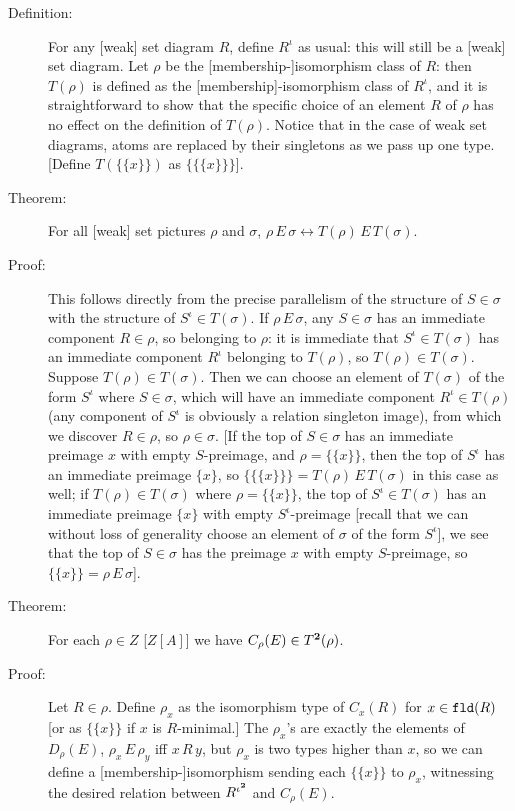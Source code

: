 \documentclass[12pt]{book}
\begin{document}
\begin{description}

\item[Definition:] For any [weak] set diagram $R$, define $R^{\iota}$
as usual: this will still be a [weak] set diagram.  Let $\rho$ be the
[membership-]isomorphism class of $R$: then $T(\rho)$ is defined as
the [membership]-isomorphism class of $R^{\iota}$, and it is
straightforward to show that the specific choice of an element $R$ of
$\rho$ has no effect on the definition of $T(\rho)$.  Notice that in
the case of weak set diagrams, atoms are replaced by their singletons
as we pass up one type.  [Define $T(\{\{x\}\})$ as $\{\{\{x\}\}\}$].

\newpage


\item[Theorem:] For all [weak] set pictures $\rho$ and $\sigma$, $\rho
\,E\, \sigma \leftrightarrow T(\rho) \,E\, T(\sigma)$.

\item[Proof:] This follows directly from the precise parallelism of
the structure of $S\in \sigma$ with the structure of $S^{\iota} \in
T(\sigma)$.  If $\rho \,E\, \sigma$, any $S\in \sigma$ has an
immediate component $R \in \rho$, so belonging to $\rho$: it is
immediate that $S^{\iota}\in T(\sigma)$ has an immediate component
$R^{\iota}$ belonging to $T(\rho)$, so $T(\rho) \in T(\sigma)$.
Suppose $T(\rho) \in T(\sigma)$.  Then we can choose an element of
$T(\sigma)$ of the form $S^{\iota}$ where $S \in \sigma$, which will
have an immediate component $R^{\iota} \in T(\rho)$ (any component of
$S^{\iota}$ is obviously a relation singleton image), from which we
discover $R \in \rho$, so $\rho \in \sigma$.  [If the top of $S \in
\sigma$ has an immediate preimage $x$ with empty $S$-preimage, and
$\rho = \{\{x\}\}$, then the top of $S^{\iota}$ has an immediate
preimage $\{x\}$, so $\{\{\{x\}\}\} = T(\rho) \,E\, T(\sigma)$ in this
case as well; if $T(\rho) \in T(\sigma)$ where $\rho=\{\{x\}\}$, the
top of $S^{\iota} \in T(\sigma)$ has an immediate preimage $\{x\}$
with empty $S^{\iota}$-preimage [recall that we can without loss of
generality choose an element of $\sigma$ of the form $S^{\iota}$], we
see that the top of $S \in \sigma$ has the preimage $x$ with empty
$S$-preimage, so $\{\{x\}\} = \rho \,E\,\sigma$].

\item[Theorem:] For each $\rho \in Z$ [$Z[A]$] we have $C_{\rho}(E)
\in T^{\bf 2}(\rho)$.

\item[Proof:] Let $R \in \rho$.  Define $\rho_x$ as the isomorphism
type of $C_x(R)$ for $x \in {\tt fld}(R)$ [or as $\{\{x\}\}$ if $x$ is
$R$-minimal.]  The $\rho_x$'s are exactly the elements of
$D_{\rho}(E)$, $\rho_x \,E\, \rho_y$ iff $x\,R\,y$, but $\rho_x$ is
two types higher than $x$, so we can define a [membership-]isomorphism
sending each $\{\{x\}\}$ to $\rho_x$, witnessing the desired relation between
$R^{\iota^{\bf 2}}$ and $C_{\rho}(E)$.


\end{description}
\end{document}
